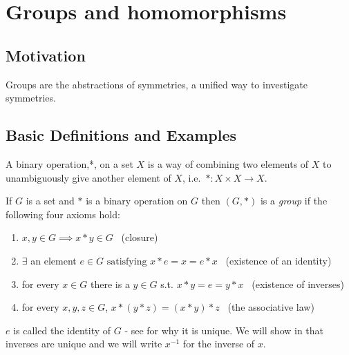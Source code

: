 \section{Groups and homomorphisms}

\hypertarget{motivation}{%
\subsection{Motivation}\label{motivation}}

Groups are the abstractions of symmetries, a unified way to investigate symmetries.

\hypertarget{basic-definitions-and-examples}{%
\subsection{Basic Definitions and Examples}\label{basic-definitions-and-examples}}

\begin{definition}
  A binary operation,*, on a set \(X\) is a way of combining two elements of \(X\) to unambiguously give another element of \(X\),
i.e.~\(*: X \times X \to X\).
\end{definition} 

\begin{definition}[Group]

If \(G\) is a set and \(*\) is a binary operation on \(G\) then \((G, *)\) is a \emph{group} if the following four axioms hold:

\begin{enumerate}
\def\labelenumi{\arabic{enumi}.}
\item
  \(x, y \in G \implies x * y \in G\) \hfill~{(closure)}
\item
  \(\exists\) an element \(e \in G \text{ satisfying } x * e = x = e * x\) \hfill~{(existence of an identity)}
\item
  for every \(x \in G\) there is a \(y \in G\) s.t. \(x * y = e = y * x\) \hfill~{(existence of inverses)}
\item
  for every \(x, y, z \in G\), \(x * (y * z) = (x * y) * z\) \hfill~{(the associative law)}
\end{enumerate}

\end{definition}

\begin{remark}
\(e\) is called the identity of \(G\) - see  for why it is unique.
We will show in  that inverses are unique and we will write \(x^{-1}\) for the inverse of \(x\).
\end{remark}

